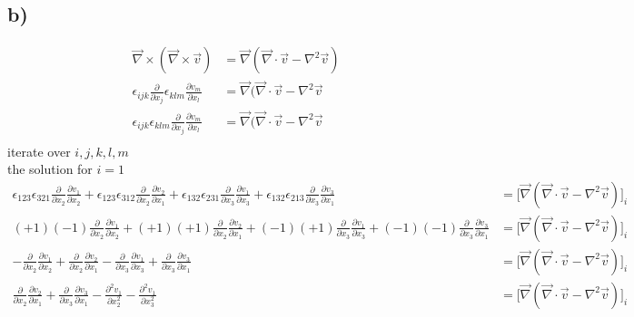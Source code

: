 \documentclass[paper=a4, fontsize=12pt]{scrartcl}
\begin{document}
\subsection*{b)}
\begin{align*}
\vec{\nabla} \times (\vec{\nabla} \times \vec{v} ) &= \vec{\nabla}(\vec{\nabla} \cdot \vec{v} - \nabla^2 \vec{v})\\
\epsilon_{ijk} \frac{\partial}{\partial x_j}\epsilon_{klm} \frac{\partial v_m}{\partial x_l} &= \vec{\nabla}(\vec{\nabla} \cdot \vec{v} - \nabla^2 \vec{v}\\
\epsilon_{ijk}\epsilon_{klm}  \frac{\partial}{\partial x_j}\frac{\partial v_m}{\partial x_l} &= \vec{\nabla}(\vec{\nabla} \cdot \vec{v} - \nabla^2 \vec{v}\\
\end{align*}
iterate over $i,j,k,l,m$\\
the solution for $i = 1$
\begin{align*}
\epsilon_{123}\epsilon_{321}  \frac{\partial}{\partial x_2}\frac{\partial v_1}{\partial x_2} 
+ \epsilon_{123}\epsilon_{312}  \frac{\partial}{\partial x_2}\frac{\partial v_2}{\partial x_1} 
+ \epsilon_{132}\epsilon_{231}  \frac{\partial}{\partial x_3}\frac{\partial v_1}{\partial x_3} 
+ \epsilon_{132}\epsilon_{213}  \frac{\partial}{\partial x_3}\frac{\partial v_3}{\partial x_1} 
&= \big[\vec{\nabla}(\vec{\nabla} \cdot \vec{v} - \nabla^2 \vec{v})\big]_i\\
(+1)(-1)  \frac{\partial}{\partial x_2}\frac{\partial v_1}{\partial x_2} 
+ (+1)(+1)  \frac{\partial}{\partial x_2}\frac{\partial v_2}{\partial x_1} 
+ (-1)(+1) \frac{\partial}{\partial x_3}\frac{\partial v_1}{\partial x_3} 
+ (-1)(-1)  \frac{\partial}{\partial x_3}\frac{\partial v_3}{\partial x_1} 
&= \big[\vec{\nabla}(\vec{\nabla} \cdot \vec{v} - \nabla^2 \vec{v})\big]_i\\
- \frac{\partial}{\partial x_2}\frac{\partial v_1}{\partial x_2} 
+\frac{\partial}{\partial x_2}\frac{\partial v_2}{\partial x_1} 
 -\frac{\partial}{\partial x_3}\frac{\partial v_1}{\partial x_3} 
+ \frac{\partial}{\partial x_3}\frac{\partial v_3}{\partial x_1} 
&= \big[\vec{\nabla}(\vec{\nabla} \cdot \vec{v} - \nabla^2 \vec{v})\big]_i\\
\frac{\partial}{\partial x_2}\frac{\partial v_2}{\partial x_1} 
+ \frac{\partial}{\partial x_3}\frac{\partial v_3}{\partial x_1} 
- \frac{\partial ^2 v_1}{\partial x_2^2} 
-\frac{\partial^2 v_1}{\partial x_3^2} 
&= \big[\vec{\nabla}(\vec{\nabla} \cdot \vec{v} - \nabla^2 \vec{v})\big]_i\\
\end{align*}
\end{document}
